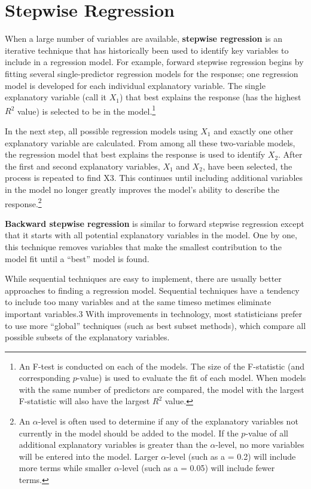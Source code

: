 \documentclass[
]{report}
\begin{document}
\section*{Stepwise Regression}\label{stepwise-regression}

When a large number of variables are available, \textbf{stepwise regression} is an iterative technique that has historically been used to identify key variables to include in a regression model. For example, forward stepwise regression begins by fitting several single-predictor regression models for the response; one regression model is developed for each individual explanatory variable. The single explanatory variable (call it \(X_1\)) that best explains the response (has the highest \(R^2\) value) is selected to be in the model.\footnote{An F-test is conducted on each of the models. The size of the F-statistic (and corresponding \(p\)-value) is used to evaluate the fit of each model. When models with the same number of predictors are compared, the model with the largest F-statistic will also have the largest \(R^2\) value.}

In the next step, all possible regression models using \(X_1\) and exactly one other explanatory variable are calculated. From among all these two-variable models, the regression model that best explains the response is used to identify \(X_2\). After the first and second explanatory variables, \(X_1\) and \(X_2\), have been selected, the process is repeated to find X3. This continues until including additional variables in the model no longer
greatly improves the model's ability to describe the response.\footnote{An \(\alpha\)-level is often used to determine if any of the explanatory variables not currently in the model should be added to the model. If the \(p\)-value of all additional explanatory variables is greater than the \(\alpha\)-level, no more variables will be entered into the model. Larger \(\alpha\)-level (such as a = 0.2) will include more terms while smaller \(\alpha\)-level (such as a = 0.05) will include fewer terms.}

\textbf{Backward stepwise regression} is similar to forward stepwise regression except that it starts with all potential explanatory variables in the model. One by one, this technique removes variables that make the smallest contribution to the model fit until a ``best'' model is found.

While sequential techniques are easy to implement, there are usually better approaches to finding a regression model. Sequential techniques have a tendency to include too many variables and at the same timeso metimes eliminate important variables.3 With improvements in technology, most statisticians prefer to use more ``global'' techniques (such as best subset methods), which compare all possible subsets of the explanatory variables.
\end{document}
